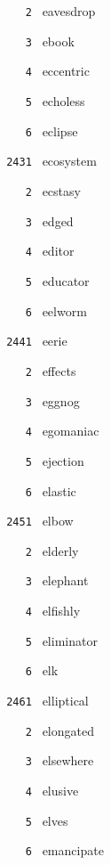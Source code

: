 \documentclass[11pt]{article}
\begin{document}
\begin{multicols}{6}
\noindent \texttt{ \ \ \ 2 } eavesdrop  \par
\noindent \texttt{ \ \ \ 3 } ebook  \par
\noindent \texttt{ \ \ \ 4 } eccentric  \par
\noindent \texttt{ \ \ \ 5 } echoless  \par
\noindent \texttt{ \ \ \ 6 } eclipse  \par
\vspace{3mm}
\noindent \texttt{ 2431 } ecosystem  \par
\noindent \texttt{ \ \ \ 2 } ecstasy  \par
\noindent \texttt{ \ \ \ 3 } edged  \par
\noindent \texttt{ \ \ \ 4 } editor  \par
\noindent \texttt{ \ \ \ 5 } educator  \par
\noindent \texttt{ \ \ \ 6 } eelworm  \par
\vspace{3mm}
\noindent \texttt{ 2441 } eerie  \par
\noindent \texttt{ \ \ \ 2 } effects  \par
\noindent \texttt{ \ \ \ 3 } eggnog  \par
\noindent \texttt{ \ \ \ 4 } egomaniac  \par
\noindent \texttt{ \ \ \ 5 } ejection  \par
\noindent \texttt{ \ \ \ 6 } elastic  \par
\vspace{3mm}
\noindent \texttt{ 2451 } elbow  \par
\noindent \texttt{ \ \ \ 2 } elderly  \par
\noindent \texttt{ \ \ \ 3 } elephant  \par
\noindent \texttt{ \ \ \ 4 } elfishly  \par
\noindent \texttt{ \ \ \ 5 } eliminator  \par
\noindent \texttt{ \ \ \ 6 } elk  \par
\vspace{3mm}
\noindent \texttt{ 2461 } elliptical  \par
\noindent \texttt{ \ \ \ 2 } elongated  \par
\noindent \texttt{ \ \ \ 3 } elsewhere  \par
\noindent \texttt{ \ \ \ 4 } elusive  \par
\noindent \texttt{ \ \ \ 5 } elves  \par
\noindent \texttt{ \ \ \ 6 } emancipate  \par

\end{multicols}
\end{document}
